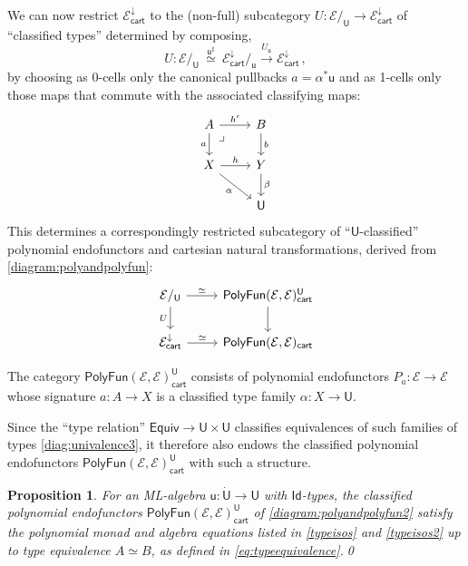 \documentclass[12pt,reqno]{amsart}
\newcommand{\EE}{\ensuremath{\mathcal{E}}}
\renewcommand{\to}{\ensuremath{\rightarrow}}
\newcommand{\too}{\ensuremath{\longrightarrow}}
\newcommand{\Id}{\mathsf{Id}}
\renewcommand{\t}{\ensuremath{\mathsf{u}}}
\newcommand{\T}{\ensuremath{\mathsf{U}}}
\newcommand{\TT}{\ensuremath{\dot{\mathsf{U}}}}
\newcommand{\pbcorner}{\arrow[dr,phantom,"\lrcorner" very near start, shift right=.5ex]} %
\newtheorem{proposition}[theorem]{Proposition}
\theoremstyle{remark}
\theoremstyle{definition}
\begin{document}
We can now restrict $\EE^{\downarrow}_{\mathsf{cart}}$ to the (non-full) subcategory $U : \EE/_\T \to \EE^{\downarrow}_{\mathsf{cart}}$ of ``classified types'' determined by composing,
\begin{equation}\label{eq:faithfulU}
U : \EE/_\T\ \stackrel{\t^{\sharp}}{\simeq}\ \EE^{\downarrow}_{\mathsf{cart}} /_\t \stackrel{U_\t}{\too} \EE^{\downarrow}_{\mathsf{cart}}\,,
\end{equation}
by choosing as 0-cells only the canonical  pullbacks $a = \alpha^{*}\t$ and as 1-cells only those maps that commute with the associated classifying maps:
\begin{equation}\label{diag:classified1cells}
\begin{tikzcd}
A \ar[d,swap, "a"] \ar[r, "{h'}"] \pbcorner & B \ar[d, "b"] \\
X \ar[r,swap,swap, "{h}"] \ar[rd,swap, "\alpha"] &  Y \ar[d, "\beta"]\\
& \T
\end{tikzcd}
\end{equation}
%
This determines a correspondingly restricted subcategory of ``$\T$-classified'' polynomial endofunctors and cartesian natural transformations, derived from \eqref{diagram:polyandpolyfun}:
\begin{equation}\label{diagram:polyandpolyfun2}
\begin{tikzcd}
\EE/_{\T} \ar[d,swap,"U"] \ar[r,"{\simeq}"] & \mathsf{PolyFun}(\EE, \EE)_{\mathsf{cart}}^\T  \ar[d] \\
\EE^{\downarrow}_{\mathsf{cart}} \ar[r,"{\simeq}"] & \mathsf{PolyFun}(\EE, \EE)_{\mathsf{cart}}
\end{tikzcd}
\end{equation}

The category $\mathsf{PolyFun}(\EE, \EE)_{\mathsf{cart}}^\T$ consists of polynomial endofunctors $P_a : \EE\to \EE$ whose signature $a: A \to X$ is a classified type family $\alpha : X \to \T$.

Since the ``type relation'' $\mathsf{Equiv} \to \T\times \T$ classifies equivalences of such families of types \eqref{diag:univalence3}, it therefore also endows 
the classified polynomial endofunctors $\mathsf{PolyFun}(\EE, \EE)_{\mathsf{cart}}^\T$ with such a structure. 

\begin{proposition}\label{prop:monad}
For an ML-algebra $\t : \TT \to \T$ with $\Id{}$-types, the classified polynomial endofunctors $\mathsf{PolyFun}(\EE, \EE)_{\mathsf{cart}}^\T$ of \eqref{diagram:polyandpolyfun2} satisfy the polynomial monad and algebra equations listed in \eqref{typeisos} and \eqref{typeisos2} up to type equivalence $A\simeq B$, as defined in \eqref{eq:typeequivalence}.\qed
\end{proposition}
\end{document}
